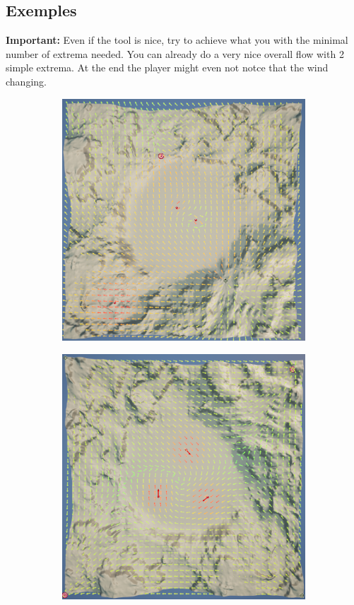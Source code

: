 \documentclass[../main.tex]{subfile}
\begin{document}
   \subsection{Exemples}
   \textbf{Important:} Even if the tool is nice, try to achieve what you with the minimal number of extrema needed. You can already do a very nice
   overall flow with 2 simple extrema. At the end the player might even not notce that the wind changing.\\
   \begin{figure}[H]
    \centering
    \begin{subfigure}{.5\textwidth}
        \centering
        \includegraphics[width=.9\textwidth]{Ressources/Map1.png}
    \end{subfigure}%
    \begin{subfigure}{.5\textwidth}
        \centering
        \includegraphics[width=.9\textwidth]{Ressources/Map5.png}

\end{subfigure}
\end{figure}
\end{document}
